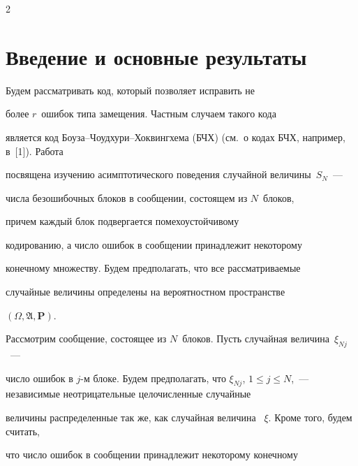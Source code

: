       \thispagestyle{headings}





      \begin{multicols}{2}





      \label{st\stat}





\section{Введение и основные результаты}





 Будем рассматривать код, который позволяет исправить не


более   $r$~ошибок типа замещения. Частным случаем такого кода


является код Боу\-за--Чоуд\-ху\-ри--Хок\-вин\-гхе\-ма (БЧХ) (см.\ о кодах БЧХ, например, в~[1]). Работа


посвящена изучению асимптотического поведения  случайной величины~$S_N$~--- 


числа безошибочных блоков  в сообщении, состоящем из $N$~блоков, 


причем каждый блок подвергается помехоустойчивому


кодированию, а число ошибок в сообщении принадлежит некоторому


конечному множеству. Будем предполагать, что все рассматриваемые


случайные величины определены на вероятностном пространстве


$(\Omega,


\mathfrak{A}, {\mathbf P})$.








 Рассмотрим  сообщение, состоящее из $N$~блоков. Пусть случайная величина~$\xi_{Nj}$~---


 число ошибок в $j$-м блоке. Будем предполагать, что  $\xi_{Nj}$, $1\le


j\le N$,~--- независимые неотрицательные целочисленные случайные


величины распределенные так же, как случайная величина~ $\xi$.   Кроме того,  будем считать,


 что число ошибок в сообщении  принадлежит некоторому конечному



\end{multicols}

